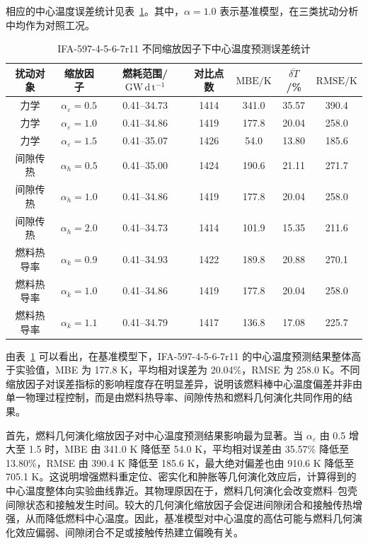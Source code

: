 相应的中心温度误差统计见表~\ref{tab:ifa597r11_temperature_alpha_sensitivity_error}。其中，\(\alpha=1.0\) 表示基准模型，在三类扰动分析中均作为对照工况。

\begin{table}[htbp]
	\centering
	\caption{IFA-597-4-5-6-7r11 不同缩放因子下中心温度预测误差统计}
	\label{tab:ifa597r11_temperature_alpha_sensitivity_error}
	\begin{tabular*}{\textwidth}{
			@{\extracolsep{\fill}}
			ccccccc
			@{}
		}
		\toprule
		\multicolumn{1}{c}{扰动对象} & \multicolumn{1}{c}{缩放因子} & 燃耗范围/$\mathrm{GW\,d\,t^{-1}}$ & 对比点数 & $\mathrm{MBE}/\mathrm{K}$ & $\overline{\delta T}$/\% & $\mathrm{RMSE}/\mathrm{K}$ \\
		\midrule
		力学 & $\alpha_{\varepsilon}=0.5$ & 0.41--34.73 & 1414 & 341.0 & 35.57 & 390.4 \\
		力学 & $\alpha_{\varepsilon}=1.0$ & 0.41--34.86 & 1419 & 177.8 & 20.04 & 258.0 \\
		力学 & $\alpha_{\varepsilon}=1.5$ & 0.41--35.07 & 1426 & 54.0 & 13.80 & 185.6 \\
		间隙传热 & $\alpha_h=0.5$ & 0.41--35.00 & 1424 & 190.6 & 21.11 & 271.7 \\
		间隙传热 & $\alpha_h=1.0$ & 0.41--34.86 & 1419 & 177.8 & 20.04 & 258.0 \\
		间隙传热 & $\alpha_h=2.0$ & 0.41--34.73 & 1414 & 101.9 & 15.35 & 211.6 \\
		燃料热导率 & $\alpha_k=0.9$ & 0.41--34.93 & 1422 & 189.8 & 20.88 & 270.1 \\
		燃料热导率 & $\alpha_k=1.0$ & 0.41--34.86 & 1419 & 177.8 & 20.04 & 258.0 \\
		燃料热导率 & $\alpha_k=1.1$ & 0.41--34.79 & 1417 & 136.8 & 17.08 & 225.7 \\
		\bottomrule
	\end{tabular*}
\end{table}

由表~\ref{tab:ifa597r11_temperature_alpha_sensitivity_error} 可以看出，在基准模型下，IFA-597-4-5-6-7r11 的中心温度预测结果整体高于实验值，MBE 为 177.8 K，平均相对误差为 20.04\%，RMSE 为 258.0 K。不同缩放因子对误差指标的影响程度存在明显差异，说明该燃料棒中心温度偏差并非由单一物理过程控制，而是由燃料热导率、间隙传热和燃料几何演化共同作用的结果。

首先，燃料几何演化缩放因子对中心温度预测结果影响最为显著。当 \(\alpha_{\varepsilon}\) 由 0.5 增大至 1.5 时，MBE 由 341.0 K 降低至 54.0 K，平均相对误差由 35.57\% 降低至 13.80\%，RMSE 由 390.4 K 降低至 185.6 K，最大绝对偏差也由 910.6 K 降低至 705.1 K。这说明增强燃料重定位、密实化和肿胀等几何演化效应后，计算得到的中心温度整体向实验曲线靠近。其物理原因在于，燃料几何演化会改变燃料--包壳间隙状态和接触发生时间。较大的几何演化缩放因子会促进间隙闭合和接触传热增强，从而降低燃料中心温度。因此，基准模型对中心温度的高估可能与燃料几何演化效应偏弱、间隙闭合不足或接触传热建立偏晚有关。

